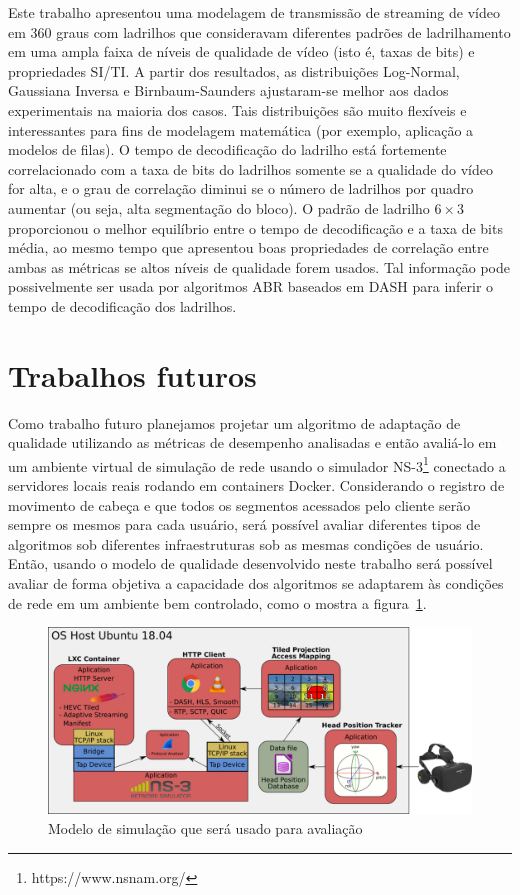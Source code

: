Este trabalho apresentou uma modelagem de transmissão de streaming de vídeo em 360 graus com ladrilhos que consideravam diferentes padrões de ladrilhamento em uma ampla faixa de níveis de qualidade de vídeo (isto é, taxas de bits) e propriedades SI/TI. A partir dos resultados, as distribuições Log-Normal, Gaussiana Inversa e Birnbaum-Saunders ajustaram-se melhor aos dados experimentais na maioria dos casos. Tais distribuições são muito flexíveis e interessantes para fins de modelagem matemática (por exemplo, aplicação a modelos de filas). O tempo de decodificação do ladrilho está fortemente correlacionado com a taxa de bits do ladrilhos somente se a qualidade do vídeo for alta, e o grau de correlação diminui se o número de ladrilhos por quadro aumentar (ou seja, alta segmentação do bloco). O padrão de ladrilho $6 \times 3$ proporcionou o melhor equilíbrio entre o tempo de decodificação e a taxa de bits média, ao mesmo tempo que apresentou boas propriedades de correlação entre ambas as métricas se altos níveis de qualidade forem usados. Tal informação pode possivelmente ser usada por algoritmos ABR baseados em DASH para inferir o tempo de decodificação dos ladrilhos.


\section{Trabalhos futuros}


Como trabalho futuro planejamos projetar um algoritmo de adaptação de qualidade utilizando as métricas de desempenho analisadas e então avaliá-lo em um ambiente virtual de simulação de rede usando o simulador NS-3\footnote{https://www.nsnam.org/} conectado a servidores locais reais rodando em containers Docker. Considerando o registro de movimento de cabeça e que todos os segmentos acessados pelo cliente serão sempre os mesmos para cada usuário, será possível avaliar diferentes tipos de algoritmos sob diferentes infraestruturas sob as mesmas condições de usuário. Então, usando o modelo de qualidade desenvolvido neste trabalho será possível avaliar de forma objetiva a capacidade dos algoritmos se adaptarem às condições de rede em um ambiente bem controlado, como o mostra a figura~\ref{fig:modelo_simulação}.

\begin{figure}[h]
	\centering
	\includegraphics[width=0.8\linewidth]{fig/modelo_simulação.png}
	\caption{Modelo de simulação que será usado para avaliação}
	\label{fig:modelo_simulação}
\end{figure}


